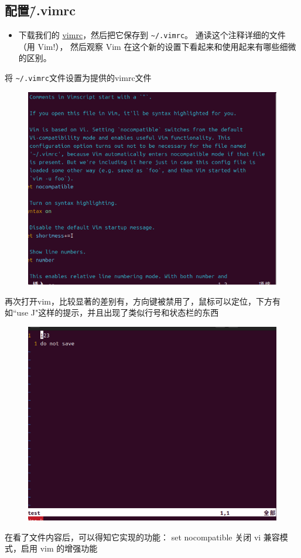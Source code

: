 \documentclass[a4paper, 12pt]{article}
\begin{document}
\subsection{配置\~/.vimrc }
\begin{itemize}
    \item 
下载我们的 \href{https://missing-semester-cn.github.io/2020/files/vimrc}{vimrc}，然后把它保存到 \verb|~/.vimrc|。 通读这个注释详细的文件 （用 Vim!）， 然后观察 Vim 在这个新的设置下看起来和使用起来有哪些细微的区别。

 
\end{itemize}
将 \verb|~/.vimrc|文件设置为提供的vimrc文件
\begin{figure}[H]
    \centering
    \includegraphics[width=1\linewidth]{vim13.png}
\end{figure}
再次打开vim，比较显著的差别有，方向键被禁用了，鼠标可以定位，下方有如“use J"这样的提示，并且出现了类似行号和状态栏的东西
\begin{figure}[H]
    \centering
    \includegraphics[width=1\linewidth]{vim14.png}

\end{figure}
在看了文件内容后，可以得知它实现的功能：
set nocompatible
关闭 vi 兼容模式，启用 vim 的增强功能
\end{document}
